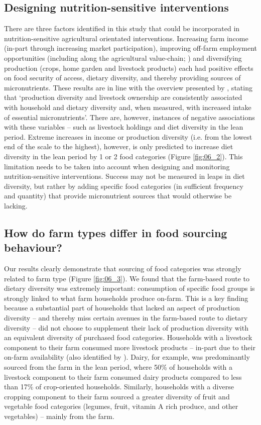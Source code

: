 \subsection{Designing nutrition-sensitive interventions}

There are three factors identified in this study that could be incorporated in nutrition-sensitive agricultural orientated interventions. Increasing farm income (in-part through increasing market participation), improving off-farm employment opportunities (including along the agricultural value-chain; \citealp{Davis2017}) and diversifying production (crops, home garden and livestock products) each had positive effects on food security of access, dietary diversity, and thereby providing sources of micronutrients. These results are in line with the overview presented by \citet[p.~147]{Ruel2018}, stating that `production diversity and livestock ownership are consistently associated with household and dietary diversity and, when measured, with increased intake of essential micronutrients'. There are, however, instances of negative associations with these variables -- such as livestock holdings and diet diversity in the lean period. Extreme increases in income or production diversity (i.e. from the lowest end of the scale to the highest), however, is only predicted to increase diet diversity in the lean period by 1 or 2 food categories (Figure \ref{fig:06_2}). This limitation needs to be taken into account when designing and monitoring nutrition-sensitive interventions. Success may not be measured in leaps in diet diversity, but rather by adding specific food categories (in sufficient frequency and quantity) that provide micronutrient sources that would otherwise be lacking.

\subsection{How do farm types differ in food sourcing behaviour?}

Our results clearly demonstrate that sourcing of food categories was strongly related to farm type (Figure \ref{fig:06_3}). We found that the farm-based route to dietary diversity was extremely important: consumption of specific food groups is strongly linked to what farm households produce on-farm. This is a key finding because a substantial part of households that lacked an aspect of production diversity -- and thereby miss certain avenues in the farm-based route to dietary diversity -- did not choose to supplement their lack of production diversity with an equivalent diversity of purchased food categories. Households with a livestock component to their farm consumed more livestock products -- in-part due to their on-farm availability (also identified by \citealp{Hetherington2017}). Dairy, for example, was predominantly sourced from the farm in the lean period, where 50\% of households with a livestock component to their farm consumed dairy products compared to less than 17\% of crop-oriented households. Similarly, households with a diverse cropping component to their farm sourced a greater diversity of fruit and vegetable food categories (legumes, fruit, vitamin A rich produce, and other vegetables) -- mainly from the farm.

